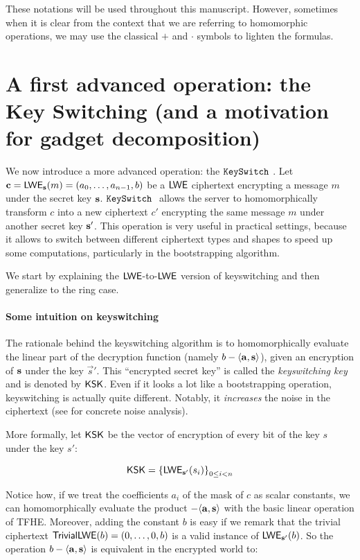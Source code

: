 \medskip
These notations will be used throughout this manuscript. However, sometimes when it is clear from the context that we are referring to homomorphic operations, we may use the classical $+$ and $\cdot$ symbols to lighten the formulas.





\section{A first advanced operation: the Key Switching (and a motivation for gadget decomposition)}
\label{sec:keyswitch}

We now introduce a more advanced operation: the $\texttt{KeySwitch}~$. Let $\mathbf c = \textsf{LWE}_{\mathbf s}(m) = (a_0, \dots, a_{n-1}, b)$ be a $\textsf{LWE}$ ciphertext encrypting a message $m$ under the secret key $\mathbf s$. $\texttt{KeySwitch}~$ allows the server to homomorphically transform $c$ into a new ciphertext $c'$ encrypting the same message $m$ under another secret key $\mathbf s'$. This operation is very useful in practical settings, because it allows to switch between different ciphertext types and shapes to speed up some computations, particularly in the bootstrapping algorithm.

We start by explaining the $\textsf{LWE}$-to-$\textsf{LWE}$ version of keyswitching and then generalize to the ring case.



\paragraph{Some intuition on keyswitching}
The rationale behind the keyswitching algorithm is to homomorphically evaluate the linear part of the decryption function (namely $b - \langle \mathbf a, \mathbf s \rangle$), given an encryption of $\mathbf s$ under the key $\vec s'$. This ``encrypted secret key'' is called the \textit{keyswitching key} and is denoted by $\textsf{KSK}$. Even if it looks a lot like a bootstrapping operation, keyswitching is actually quite different. Notably, it \textit{increases} the noise in the ciphertext (see \cite{JC:CGGI20, these_tap} for concrete noise analysis).


More formally, let $\textsf{KSK}$ be the vector of encryption of every bit of the key $s$ under the key $s'$:

\[
	\textsf{KSK} = \left \{ \textsf{LWE}_{\mathbf s'}(s_i ) \right \}_{0 \le i < n}
\]

Notice how, if we treat the coefficients $a_i$ of the mask of $c$ as scalar constants, we can homomorphically evaluate the product $- \langle \mathbf a ,\mathbf s \rangle$ with the basic linear operation of TFHE. Moreover, adding the constant $b$ is easy if we remark that the trivial ciphertext $\textsf{TrivialLWE}(b) = (0, \dots, 0, b)$ is a valid instance of $\textsf{LWE}_{\mathbf s'}(b)$. So the operation $b - \langle \mathbf a, \mathbf s \rangle$ is equivalent in the encrypted world to:


